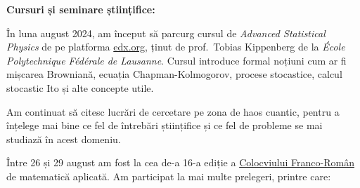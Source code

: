 
\makereportpreamble

\textbf{Cursuri și seminare științifice:}

În luna august 2024, am început să parcurg cursul de \emph{Advanced Statistical Physics} de pe platforma \href{https://edx.org}{edx.org}, ținut de prof.~Tobias Kippenberg de la \emph{École Polytechnique Fédérale de Lausanne}. Cursul introduce formal noțiuni cum ar fi mișcarea Browniană, ecuația Chapman-Kolmogorov, procese stocastice, calcul stocastic Ito și alte concepte utile.

Am continuat să citesc lucrări de cercetare pe zona de haos cuantic, pentru a înțelege mai bine ce fel de întrebări științifice și ce fel de probleme se mai studiază în acest domeniu.

Între 26 și 29 august am fost la cea de-a 16-a ediție a \href{https://16colfrro.sciencesconf.org/?forward-action=index&forward-controller=index&lang=en}{Colocviului Franco-Român} de matematică aplicată. Am participat la mai multe prelegeri, printre care:

